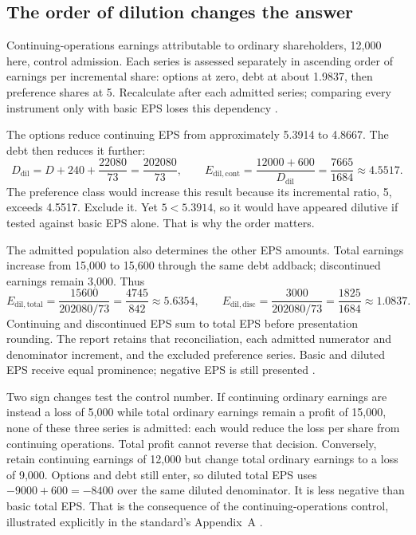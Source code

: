 \subsection{The order of dilution changes the answer}

Continuing-operations earnings attributable to ordinary shareholders,
12,000 here, control admission. Each series is assessed separately in
ascending order of earnings per incremental share: options at zero,
debt at about 1.9837, then preference shares at 5. Recalculate after each
admitted series; comparing every instrument only with basic EPS loses
this dependency \citep[IAS~33, paragraphs 41--44]{eu20231803}.

The options reduce continuing EPS from approximately 5.3914 to 4.8667.
The debt then reduces it further:
\[
 D_{\mathrm{dil}}=D+240+\frac{22080}{73}
                 =\frac{202080}{73},
 \qquad
 E_{\mathrm{dil,cont}}
   =\frac{12000+600}{D_{\mathrm{dil}}}
   =\frac{7665}{1684}\approx4.5517.
\]
The preference class would increase this result because its incremental
ratio, 5, exceeds 4.5517. Exclude it. Yet $5<5.3914$, so it would have
appeared dilutive if tested against basic EPS alone. That is why the
order matters.

The admitted population also determines the other EPS amounts. Total
earnings increase from 15,000 to 15,600 through the same debt addback;
discontinued earnings remain 3,000. Thus
\[
 E_{\mathrm{dil,total}}=\frac{15600}{202080/73}
       =\frac{4745}{842}\approx5.6354,\qquad
 E_{\mathrm{dil,disc}}=\frac{3000}{202080/73}
       =\frac{1825}{1684}\approx1.0837.
\]
Continuing and discontinued EPS sum to total EPS before presentation
rounding. The report retains that reconciliation, each admitted numerator
and denominator increment, and the excluded preference series. Basic and
diluted EPS receive equal prominence; negative EPS is still presented
\citep[IAS~33, paragraphs 66--70]{eu20231803}.

Two sign changes test the control number. If continuing ordinary earnings
are instead a loss of 5,000 while total ordinary earnings remain a profit
of 15,000, none of these three series is admitted: each would reduce the
loss per share from continuing operations. Total profit cannot reverse
that decision. Conversely, retain continuing earnings of 12,000 but
change total ordinary earnings to a loss of 9,000. Options and debt still
enter, so diluted total EPS uses $-9000+600=-8400$ over the same diluted
denominator. It is less negative than basic total EPS. That is the
consequence of the continuing-operations control, illustrated explicitly
in the standard's Appendix~A
\citep[IAS~33, paragraphs 41--43 and A3]{eu20231803}.

